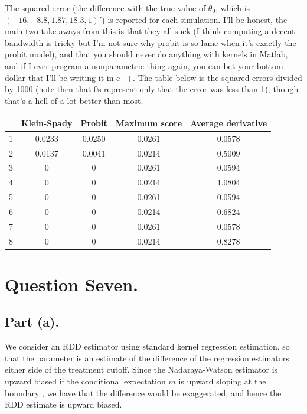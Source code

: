 \documentclass{article}
\begin{document}
The squared error (the difference with the true value of $\theta_{0}$, which is $(-16,-8.8,1.87,18.3,1)'$) is reported for each simulation. I'll be honest, the main two take aways from this is that they all suck (I think computing a decent bandwidth is tricky but I'm not sure why probit is so lame when it's exactly the probit model), and that you should never do anything with kernels in Matlab, and if I ever program a nonparametric thing again, you can bet your bottom dollar that I'll be writing it in c++. The table below is the squared errors divided by 1000 (note then that 0s represent only that the error was less than 1), though that's a hell of a lot better than most.
\begin{center}
\begin{tabular}{|c||c|c|c|c|}
\hline 
&Klein-Spady&Probit&Maximum score &Average derivative \\ \hline \hline
1&    0.0233  &  0.0250 &   0.0261 &   0.0578 \\ \hline
2&   0.0137 &   0.0041 &   0.0214 &   0.5009 \\ \hline
3 &      0   &      0  &  0.0261 &   0.0594 \\ \hline
4 &      0   &      0 &   0.0214 &   1.0804 \\ \hline
5 &      0   &      0  &  0.0261 &   0.0594 \\ \hline
6 &      0   &      0  &  0.0214  &  0.6824 \\ \hline
7 &      0   &      0  &  0.0261  &  0.0578 \\ \hline
8 &      0   &      0  &  0.0214  &  0.8278 \\ \hline
\end{tabular}
\end{center}


\section{Question Seven.}
\subsection{Part (a).}
We consider an RDD estimator using standard kernel regression estimation, so that the parameter is an estimate of the difference of the regression estimators either side of the treatment cutoff. Since the Nadaraya-Watson estimator is upward biased if the conditional expectation $m$ is upward sloping at the boundary \cite{racine2001}\cite{cunha13}, we have that the difference would be exaggerated, and hence the RDD estimate is upward biased.
\end{document}

